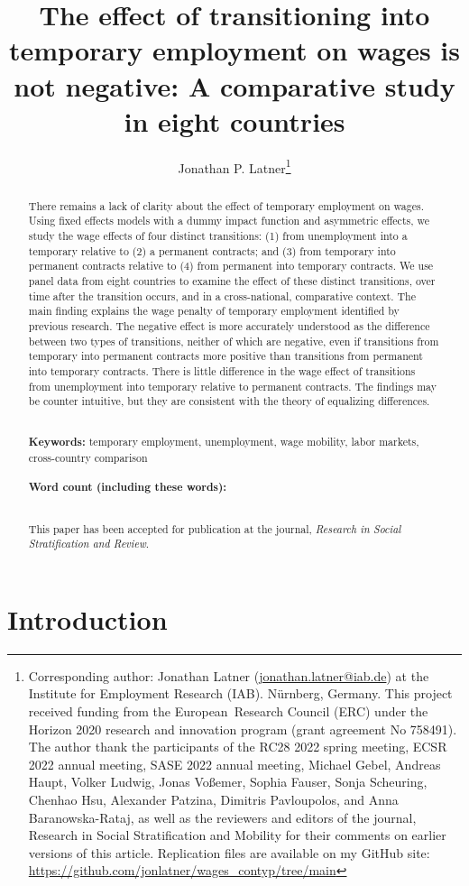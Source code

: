\documentclass[12pt]{article}
\title{The effect of transitioning into temporary employment on wages is not negative: A comparative study in eight countries}
\author{Jonathan P. Latner\thanks{Corresponding author: Jonathan Latner (\url{jonathan.latner@iab.de}) at the Institute for Employment Research (IAB).  Nürnberg, Germany.  This project received funding from the European\ Research Council (ERC) under the Horizon 2020 research and innovation program (grant agreement No 758491).  The author thank the participants of the RC28 2022 spring meeting, ECSR 2022 annual meeting, SASE 2022 annual meeting, Michael Gebel, Andreas Haupt, Volker Ludwig, Jonas Voßemer, Sophia Fauser, Sonja Scheuring, Chenhao Hsu, Alexander Patzina, Dimitris Pavloupolos, and Anna Baranowska-Rataj, as well as the reviewers and editors of the journal, Research in Social Stratification and Mobility for their comments on earlier versions of this article.  Replication files are available on my GitHub site: \url{https://github.com/jonlatner/wages_contyp/tree/main}}}
\date{\vspace{-5ex}}
\newcommand\wordcount{}
\begin{document}
\maketitle

\begin{abstract}

\noindent 
There remains a lack of clarity about the effect of temporary employment on wages.  Using fixed effects models with a dummy impact function and asymmetric effects, we study the wage effects of four distinct transitions: (1) from unemployment into a temporary relative to (2) a permanent contracts; and (3) from temporary into permanent contracts relative to (4) from permanent into temporary contracts.  We use panel data from eight countries to examine the effect of these distinct transitions, over time after the transition occurs, and in a cross-national, comparative context.  The main finding explains the wage penalty of temporary employment identified by previous research.  The negative effect is more accurately understood as the difference between two types of transitions, neither of which are negative, even if transitions from temporary into permanent contracts more positive than transitions from permanent into temporary contracts.  There is little difference in the wage effect of transitions from unemployment into temporary relative to permanent contracts. The findings may be counter intuitive, but they are consistent with the theory of equalizing differences.  

\noindent
\\
{\bf Keywords:} temporary employment, unemployment, wage mobility, labor markets, cross-country comparison \\
\\
{\bf Word count (including these words):} \wordcount

\noindent
\\
This paper has been accepted for publication at the journal, \emph{Research in Social Stratification and Review}. \\

\end{abstract}

\doublespacing
\clearpage
\section{Introduction}
\end{document}
